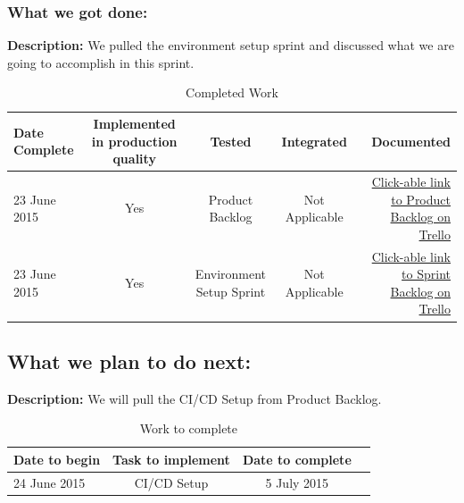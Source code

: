 \documentclass[a4paper]{article}
\begin{document}
\subsubsection{What we got done: }
\textbf{Description: }We pulled the environment setup sprint and discussed what we are going to accomplish in this sprint. \\

\begin{table}[h]
\centering
\caption{Completed Work}
\begin{tabular}{| l | c | c | c | r |}
\hline 
Date Complete & Implemented in production quality & Tested & Integrated & Documented\\ \hline
23 June 2015 & Yes & Product Backlog & Not Applicable & \href{https://trello.com/b/FtBs3HX1}{Click-able link to Product Backlog on Trello}\\ \hline
23 June 2015 & Yes & Environment Setup Sprint & Not Applicable & \href{https://trello.com/b/hBJF6EUd}{Click-able link to Sprint Backlog on Trello}\\ 
\hline
\end{tabular}
\end{table}

\subsection{What we plan to do next:}
\textbf{Description: }We will pull the CI/CD Setup from Product Backlog. \\

\begin{table}[h]
\centering
\caption{Work to complete}
\begin{tabular}{| l | c | c | r |}
\hline
Date to begin  & Task to implement & Date to complete\\ \hline
24 June 2015 & CI/CD Setup & 5 July 2015 \\
\hline
\end{tabular}
\end{table}
\end{document}
